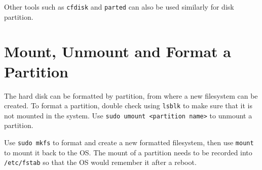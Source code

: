 Other tools such as \verb|cfdisk| and \verb|parted| can also be used similarly for disk partition.

\section{Mount, Unmount and Format a Partition}

The hard disk can be formatted by partition, from where a new filesystem can be created. To format a partition, double check using \verb|lsblk| to make sure that it is not mounted in the system. Use \verb|sudo umount <partition name>| to unmount a partition.

Use \verb|sudo mkfs| to format and create a new formatted filesystem, then use \verb|mount| to mount it back to the OS. The mount of a partition needs to be recorded into \verb|/etc/fstab| so that the OS would remember it after a reboot.
